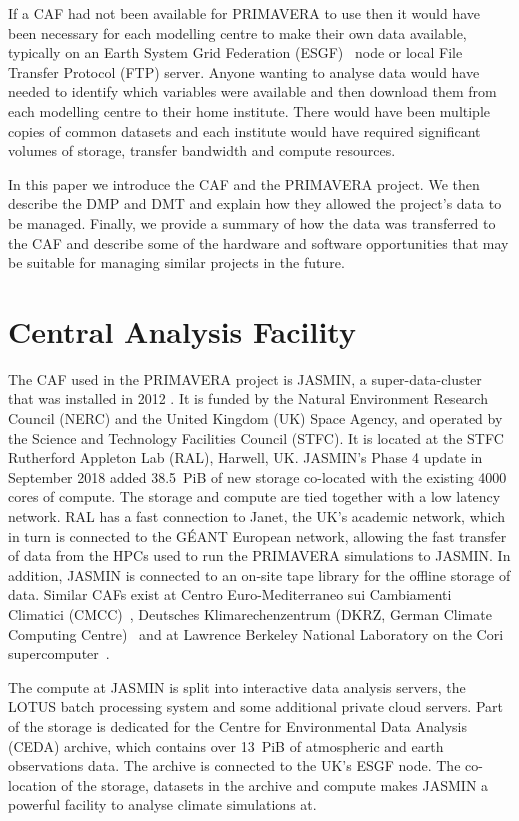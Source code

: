 \documentclass[gmd, manuscript]{copernicus}
\begin{document}
If a CAF had not been available for PRIMAVERA to use then it would have been necessary for each modelling centre to make their own data available, typically on an Earth System Grid Federation (ESGF)~\citep{ESGFCinquini} node or local File Transfer Protocol (FTP) server. Anyone wanting to analyse data would have needed to identify which variables were available and then download them from each modelling centre to their home institute. There would have been multiple copies of common datasets and each institute would have required significant volumes of storage, transfer bandwidth and compute resources.

In this paper we introduce the CAF and the PRIMAVERA project. We then describe the DMP and DMT and explain how they allowed the project's data to be managed. Finally, we provide a summary of how the data was transferred to the CAF and describe some of the hardware and software opportunities that may be suitable for managing similar projects in the future.

\section{Central Analysis Facility}

The CAF used in the PRIMAVERA project is JASMIN, a super-data-cluster that was installed in 2012 \citep{lawrence2013storing}. It is funded by the Natural Environment Research Council (NERC) and the United Kingdom (UK) Space Agency, and operated by the Science and Technology Facilities Council (STFC). It is located at the STFC Rutherford Appleton Lab (RAL), Harwell, UK. JASMIN's Phase 4 update in September 2018 added 38.5~PiB of new storage co-located with the existing 4000 cores of compute. The storage and compute are tied together with a low latency network. RAL has a fast connection to Janet, the UK's academic network, which in turn is connected to the G\'{E}ANT European network, allowing the fast transfer of data from the HPCs used to run the PRIMAVERA simulations to JASMIN. In addition, JASMIN is connected to an on-site tape library for the offline storage of data. Similar CAFs exist at Centro Euro-Mediterraneo sui Cambiamenti Climatici (CMCC)~\citep{CMCC}, Deutsches Klimarechenzentrum (DKRZ, German Climate Computing Centre)~\citep{dkrz} and at Lawrence Berkeley National Laboratory on the Cori supercomputer~\citep{cori}.

The compute at JASMIN is split into interactive data analysis servers, the LOTUS batch processing system and some additional private cloud servers. Part of the storage is dedicated for the Centre for Environmental Data Analysis (CEDA) archive, which contains over 13~PiB of atmospheric and earth observations data. The archive is connected to the UK's ESGF node. The co-location of the storage, datasets in the archive and compute makes JASMIN a powerful facility to analyse climate simulations at.
\end{document}
